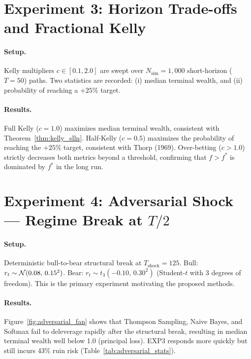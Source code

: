 \section{Experiment 3: Horizon Trade-offs and Fractional Kelly}
\label{sec:exp3}

\paragraph{Setup.}
Kelly multipliers $c\in[0.1, 2.0]$ are swept over $N_{\text{sim}}=1{,}000$
short-horizon ($T=50$) paths.  Two statistics are recorded: (i) median
terminal wealth, and (ii) probability of reaching a $+25\%$ target.

\paragraph{Results.}
Full Kelly ($c=1.0$) maximizes median terminal wealth, consistent with
Theorem~\ref{thm:kelly_slln}.  Half-Kelly ($c=0.5$) maximizes the probability
of reaching the $+25\%$ target, consistent with Thorp (1969).  Over-betting
($c>1.0$) strictly decreases both metrics beyond a threshold, confirming that
$f > f^*$ is dominated by $f^*$ in the long run.

\section{Experiment 4: Adversarial Shock --- Regime Break at $T/2$}
\label{sec:exp4}

\paragraph{Setup.}
Deterministic bull-to-bear structural break at $T_{\text{shock}}=125$.
Bull: $r_t\sim\mathcal{N}(0.08,\,0.15^2)$.
Bear: $r_t\sim t_3(-0.10,\,0.30^2)$ (Student-$t$ with 3 degrees of freedom).
This is the primary experiment motivating the proposed methods.

\paragraph{Results.}
Figure~\ref{fig:adversarial_fan} shows that Thompson Sampling, Naive Bayes,
and Softmax fail to deleverage rapidly after the structural break, resulting
in median terminal wealth well below 1.0 (principal loss).  EXP3 responds
more quickly but still incurs 43\% ruin risk (Table~\ref{tab:adversarial_stats}).

